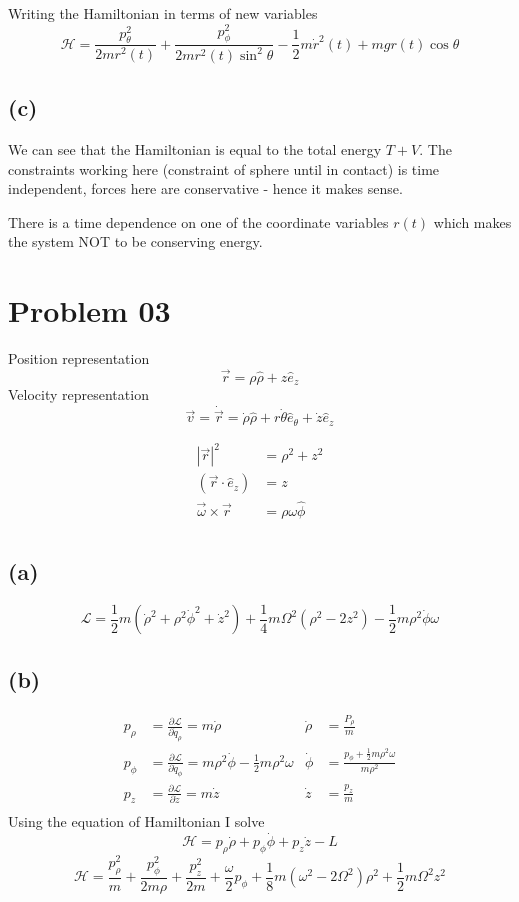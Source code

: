 \documentclass[letter, 10pts]{article}
\begin{document}
Writing the Hamiltonian in terms of new variables 
\[
\mathcal H = 
\frac{p_\theta ^2}{2 m r^2 (t)} + 
\frac{p^2_\phi}{2 m r^2(t) \sin ^2 \theta} -
\frac{1}{2} m \dot{r}^2(t) + mg r(t) \cos \theta
\] 

\subsection*{(c)} 
We can see that the Hamiltonian is equal to the total energy $T + V$. The constraints working here (constraint of sphere until in contact) is time independent, forces here are conservative - hence it makes sense. 

There is a time dependence on one of the coordinate variables $r(t)$ which makes the system NOT to be conserving energy. 




\section*{Problem 03}
Position representation \[
	\vec{r} = \rho \hat{\rho} + z \hat{e}_z
\] 
Velocity representation \[
	\vec{v} = \dot{\vec{r}} = \dot{\rho} \hat{\rho} + r \dot{\theta} \hat{e}_\theta + 
	\dot{z} \hat{e}_z
\]

\begin{align*}
	|\vec{r}|^2 &= \rho^2 + z^2 \\
	(\vec{r} \cdot \hat{e}_z) &= z \\
	\vec{\omega} \times \vec{r} &= \rho \omega \hat{\phi}  \\
\end{align*}


\subsection*{(a)} 
\[\boxed{
\mathcal L 
=
\frac{1}{2} m (\dot{\rho } ^2 + \rho ^2 \dot{\phi}^2 + \dot{z}^2 ) + 
\frac{1}{4} m \Omega^2 (\rho^2 - 2 z^2) 
- \frac{1}{2} m \rho^2 \dot{\phi} \omega  
\tag{$\omega = e B  / m c $ }}
\] 

\subsection*{(b)} 
\begin{align*}
	p_\rho &= \frac{\partial \mathcal L}{\partial \dot{q}_\rho } 
	= m \dot{\rho} 
	       & \dot{\rho} &= \frac{P_\rho}{m} \\ 
	p_\phi &= \frac{\partial \mathcal L}{\partial \dot{q}_\phi}
	= m \rho^2 \dot{\phi} - \frac{1}{2} m \rho^2 \omega 
	       & \dot{\phi} &= \frac{p_\phi + \frac{1}{2} m \rho^2 \omega }{m \rho^2}\\
	p_z &= \frac{\partial \mathcal L}{\partial \dot{z} } = m \dot{z}
	    & \dot{z} &= \frac{p_z}{m} \\
\end{align*}
Using the equation of Hamiltonian I solve
\[
\mathcal H 
= 
p_\rho \dot{\rho} + 
p_\phi \dot{\phi} + 
p_z \dot{z} - L
\] 
\[
\boxed{
\mathcal H 
=
\frac{p_\rho ^2}{m} + 
\frac{p^2_\phi}{2 m \rho} + 
\frac{p_z^2}{2m} + 
\frac{\omega}{2} p_\phi + 
\frac{1}{8} m \left(\omega^2 - 2 \Omega^2\right) \rho^2
+ 
\frac{1}{2} m \Omega^2 z^2
}
\] 
\end{document}
